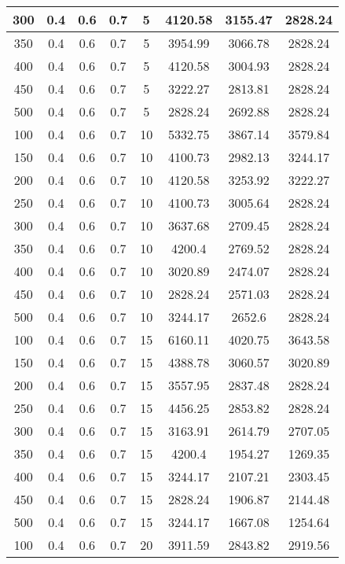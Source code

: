 \documentclass[a4paper, 12pt]{extreport}
\begin{document}
\begin{itemize}
\begin{longtable}{|c|c|c|c|c|c|c|c|}
			300 & 0.4 & 0.6 & 0.7 & 5 & 4120.58 & 3155.47 & 2828.24 \\\hline
			350 & 0.4 & 0.6 & 0.7 & 5 & 3954.99 & 3066.78 & 2828.24 \\\hline
			400 & 0.4 & 0.6 & 0.7 & 5 & 4120.58 & 3004.93 & 2828.24 \\\hline
			450 & 0.4 & 0.6 & 0.7 & 5 & 3222.27 & 2813.81 & 2828.24 \\\hline
			500 & 0.4 & 0.6 & 0.7 & 5 & 2828.24 & 2692.88 & 2828.24 \\\hline
			100 & 0.4 & 0.6 & 0.7 & 10 & 5332.75 & 3867.14 & 3579.84 \\\hline
			150 & 0.4 & 0.6 & 0.7 & 10 & 4100.73 & 2982.13 & 3244.17 \\\hline
			200 & 0.4 & 0.6 & 0.7 & 10 & 4120.58 & 3253.92 & 3222.27 \\\hline
			250 & 0.4 & 0.6 & 0.7 & 10 & 4100.73 & 3005.64 & 2828.24 \\\hline
			300 & 0.4 & 0.6 & 0.7 & 10 & 3637.68 & 2709.45 & 2828.24 \\\hline
			350 & 0.4 & 0.6 & 0.7 & 10 & 4200.4 & 2769.52 & 2828.24 \\\hline
			400 & 0.4 & 0.6 & 0.7 & 10 & 3020.89 & 2474.07 & 2828.24 \\\hline
			450 & 0.4 & 0.6 & 0.7 & 10 & 2828.24 & 2571.03 & 2828.24 \\\hline
			500 & 0.4 & 0.6 & 0.7 & 10 & 3244.17 & 2652.6 & 2828.24 \\\hline
			100 & 0.4 & 0.6 & 0.7 & 15 & 6160.11 & 4020.75 & 3643.58 \\\hline
			150 & 0.4 & 0.6 & 0.7 & 15 & 4388.78 & 3060.57 & 3020.89 \\\hline
			200 & 0.4 & 0.6 & 0.7 & 15 & 3557.95 & 2837.48 & 2828.24 \\\hline
			250 & 0.4 & 0.6 & 0.7 & 15 & 4456.25 & 2853.82 & 2828.24 \\\hline
			300 & 0.4 & 0.6 & 0.7 & 15 & 3163.91 & 2614.79 & 2707.05 \\\hline
			350 & 0.4 & 0.6 & 0.7 & 15 & 4200.4 & 1954.27 & 1269.35 \\\hline
			400 & 0.4 & 0.6 & 0.7 & 15 & 3244.17 & 2107.21 & 2303.45 \\\hline
			450 & 0.4 & 0.6 & 0.7 & 15 & 2828.24 & 1906.87 & 2144.48 \\\hline
			500 & 0.4 & 0.6 & 0.7 & 15 & 3244.17 & 1667.08 & 1254.64 \\\hline
			100 & 0.4 & 0.6 & 0.7 & 20 & 3911.59 & 2843.82 & 2919.56 \\\hline

\end{longtable}
\end{itemize}
\end{document}
